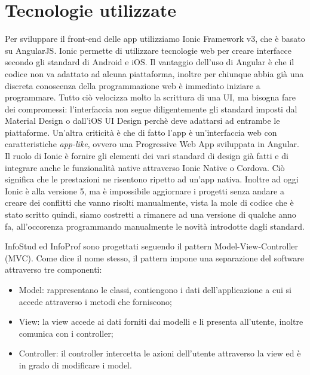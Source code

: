 \documentclass[Lau, oneside]{sapthesis}%
\begin{document}
\section{Tecnologie utilizzate}
\label{sec:tech}
Per sviluppare il front-end delle app utilizziamo Ionic Framework v3, che è basato su AngularJS. Ionic permette di utilizzare tecnologie
web per creare interfacce secondo gli standard di Android e iOS. Il vantaggio dell'uso di Angular è che il codice non va adattato ad alcuna
piattaforma, inoltre per chiunque abbia già una discreta conoscenza della programmazione web è immediato iniziare a programmare. Tutto
ciò velocizza molto la scrittura di una UI, ma bisogna fare dei compromessi: l'interfaccia non segue diligentemente gli standard imposti
dal Material Design o dall'iOS UI Design perchè deve adattarsi ad entrambe le piattaforme. Un'altra criticità è che di fatto l'app è
un'interfaccia web con caratteristiche \textit{app-like}, ovvero una Progressive Web App sviluppata in Angular. 
Il ruolo di Ionic è fornire gli elementi dei vari standard di design già fatti e di integrare anche le funzionalità native attraverso
Ionic Native o Cordova. Ciò significa che le prestazioni ne risentono ripetto ad un'app nativa. Inoltre ad oggi Ionic è alla versione 5,
ma è impossibile aggiornare i progetti senza andare a creare dei conflitti che vanno risolti manualmente, vista la mole di codice che è
stato scritto quindi, siamo costretti a rimanere ad una versione di qualche anno fa, all'occorenza programmando manualmente le novità
introdotte dagli standard.

InfoStud ed InfoProf sono progettati seguendo il pattern Model-View-Controller (MVC). Come dice il nome stesso, il pattern impone una 
separazione del software attraverso tre componenti:
\begin{itemize}
	\item Model: rappresentano le classi, contiengono i dati dell'applicazione a cui si accede attraverso i metodi che forniscono;
	\item View: la view accede ai dati forniti dai modelli e li presenta all'utente, inoltre comunica con i controller;
	\item Controller: il controller intercetta le azioni dell'utente attraverso la view ed è in grado di modificare i model. 
\end{itemize}
\end{document}
